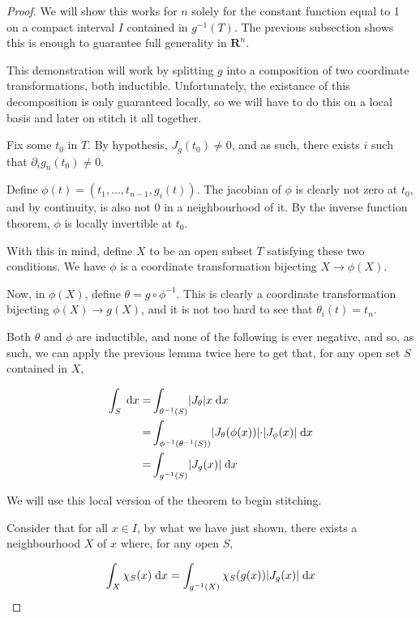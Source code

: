 \documentclass[11pt]{article}
\theoremstyle{definition}
\theoremstyle{plain}
\newcommand{\R}{\mathbf{R}}
\newcommand{\mo}{^{-1}}
\begin{document}
\begin{proof}
We will show this works for $n$ solely for the constant function equal to 1 on a compact interval $I$ contained in $g\mo(T)$. The previous subsection shows this is enough to guarantee full generality in $\R^n$.

This demonstration will work by splitting $g$ into a composition of two coordinate transformations, both inductible. Unfortunately, the existance of this decomposition is only guaranteed locally, so we will have to do this on a local basis and later on stitch it all together.

Fix some $t_0$ in $T$. By hypothesis, $J_g(t_0) \neq 0$, and as such, there exists $i$ such that $\partial_i g_n(t_0) \neq 0$.

Define $\phi(t) = (t_1, \ldots, t_{n-1}, g_i(t))$. The jacobian of $\phi$ is clearly not zero at $t_0$, and by continuity, is also not 0 in a neighbourhood of it. By the inverse function theorem, $\phi$ is locally invertible at $t_0$.

With this in mind, define $X$ to be an open subset $T$ satisfying these two conditions. We have $\phi$ is a coordinate transformation bijecting $X \rightarrow \phi(X)$.

Now, in $\phi(X)$, define $\theta = g \circ \phi\mo$. This is clearly a coordinate transformation bijecting $\phi(X) \rightarrow g(X)$, and it is not too hard to see that $\theta_i(t) = t_n$. %

Both $\theta$ and $\phi$ are inductible, and none of the following is ever negative, and so, as such, we can apply the previous lemma twice here to get that, for any open set $S$ contained in $X$,

\begin{align*}
\int_S \d x =& \int_{\theta\mo(S)} \rvert J_{\theta} \lvert x \d x \\
=& \int_{\phi\mo(\theta\mo(S))} \rvert J_{\theta}(\phi(x)) \lvert \cdot \rvert J_\phi(x) \lvert \d x \\
=& \int_{g\mo(S)} \rvert J_g(x) \lvert \d x
\end{align*}

We will use this local version of the theorem to begin stitching.

Consider that for all $x \in I$, by what we have just shown, there exists a neighbourhood $X$ of $x$ where, for any open $S$,

\[ \int_X \chi_S(x) \d x = \int_{g\mo(X)} \chi_S(g(x)) \rvert J_g(x) \lvert \d x \]


\end{proof}
\end{document}
